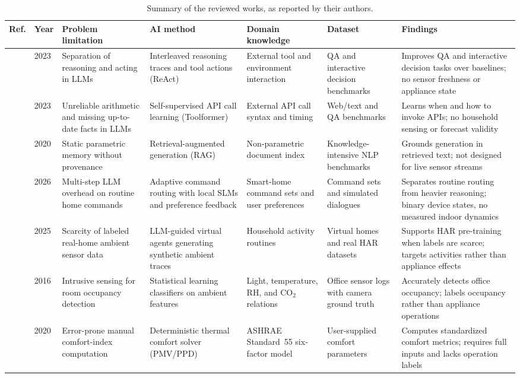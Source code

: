 \begin{table}[t]
\caption{Summary of the reviewed works, as reported by their authors.}
\label{tab:summary}
\centering
\footnotesize
\setlength{\tabcolsep}{3.5pt}
\begin{tabular}{@{}>{\raggedright}p{1.25cm}>{\raggedright}p{0.6cm}>{\raggedright}p{2.75cm}>{\raggedright}p{2.65cm}>{\raggedright}p{2.45cm}>{\raggedright}p{2.55cm}>{\raggedright\arraybackslash}p{3.45cm}@{}}
\toprule
Ref. & Year & Problem limitation & AI method & Domain knowledge & Dataset & Findings \\
\midrule
\cite{yao2023react} & 2023 & Separation of reasoning and acting in LLMs & Interleaved reasoning traces and tool actions (ReAct) & External tool and environment interaction & QA and interactive decision benchmarks & Improves QA and interactive decision tasks over baselines; no sensor freshness or appliance state \\
\cite{schick2023toolformer} & 2023 & Unreliable arithmetic and missing up-to-date facts in LLMs & Self-supervised API call learning (Toolformer) & External API call syntax and timing & Web/text and QA benchmarks & Learns when and how to invoke APIs; no household sensing or forecast validity \\
\cite{lewis2020rag} & 2020 & Static parametric memory without provenance & Retrieval-augmented generation (RAG) & Non-parametric document index & Knowledge-intensive NLP benchmarks & Grounds generation in retrieved text; not designed for live sensor streams \\
\cite{lim2026adahome} & 2026 & Multi-step LLM overhead on routine home commands & Adaptive command routing with local SLMs and preference feedback & Smart-home command sets and user preferences & Command sets and simulated dialogues & Separates routine routing from heavier reasoning; binary device states, no measured indoor dynamics \\
\cite{leng2025agentsense} & 2025 & Scarcity of labeled real-home ambient sensor data & LLM-guided virtual agents generating synthetic ambient traces & Household activity routines & Virtual homes and real HAR datasets & Supports HAR pre-training when labels are scarce; targets activities rather than appliance effects \\
\cite{candanedo2016occupancy} & 2016 & Intrusive sensing for room occupancy detection & Statistical learning classifiers on ambient features & Light, temperature, RH, and CO$_2$ relations & Office sensor logs with camera ground truth & Accurately detects office occupancy; labels occupancy rather than appliance operations \\
\cite{tartarini2020cbe} & 2020 & Error-prone manual comfort-index computation & Deterministic thermal comfort solver (PMV/PPD) & ASHRAE Standard~55 six-factor model~\cite{ashrae55,mishra2026myths} & User-supplied comfort parameters & Computes standardized comfort metrics; requires full inputs and lacks operation labels \\
\bottomrule
\end{tabular}
\end{table}

